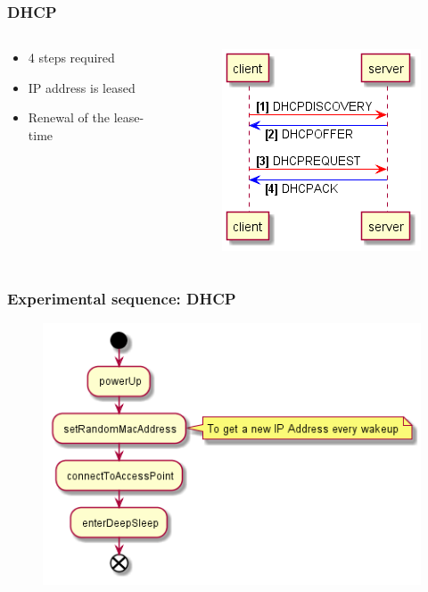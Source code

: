 \begin{frame}
    \frametitle{DHCP}
    \begin{columns}
        \begin{column}{0.5\textwidth}
            \begin{itemize}
                \item 4 steps required
                \item IP address is leased
                \item Renewal of the lease-time

            \end{itemize}
        \end{column}
        \begin{column}{0.5\textwidth}
            \begin{figure}
                \includegraphics[scale=0.7]{../paper/fig/sequence_DHCP_connection.png}
            \end{figure}
        \end{column}
    \end{columns}
\end{frame}

\begin{frame}
    \frametitle{Experimental sequence: DHCP}
    \begin{figure}
        \includegraphics[scale=0.6]{../paper/fig/sequence_DHCP.png}
    \end{figure}
\end{frame}

